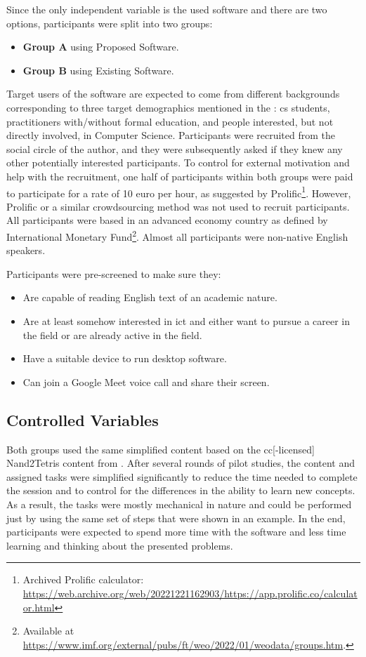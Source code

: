 Since the only independent variable is the used software and there are two options, participants were split into two groups:

\begin{itemize}
    \item \textbf{Group A} using Proposed Software.
    \item \textbf{Group B} using Existing Software.
\end{itemize}

Target users of the software are expected to come from different backgrounds corresponding to three target demographics mentioned in the : \gls{cs} students, practitioners with/without formal education, and people interested, but not directly involved, in Computer Science.
Participants were recruited from the social circle of the author, and they were subsequently asked if they knew any other potentially interested participants.
To control for external motivation and help with the recruitment, one half of participants within both groups were paid to participate for a rate of 10 euro per hour, as suggested by Prolific\footnote{Archived Prolific calculator: \url{https://web.archive.org/web/20221221162903/https://app.prolific.co/calculator.html}}.
However, Prolific or a similar crowdsourcing method was not used to recruit participants.
All participants were based in an advanced economy country as defined by International Monetary Fund\footnote{Available at \url{https://www.imf.org/external/pubs/ft/weo/2022/01/weodata/groups.htm}.}.
Almost all participants were non-native English speakers.

Participants were pre-screened to make sure they:
\begin{itemize}
    \item Are capable of reading English text of an academic nature.
    \item Are at least somehow interested in \gls{ict} and either want to pursue a career in the field or are already active in the field.
    \item Have a suitable device to run desktop software.
    \item Can join a Google Meet voice call and share their screen.
\end{itemize}

\subsection{Controlled Variables}

Both groups used the same simplified content based on the \gls{cc}[-licensed] Nand2Tetris content from \textcite{nand2tetris}.
After several rounds of pilot studies, the content and assigned tasks were simplified significantly to reduce the time needed to complete the session and to control for the differences in the ability to learn new concepts.
As a result, the tasks were mostly mechanical in nature and could be performed just by using the same set of steps that were shown in an example.
In the end, participants were expected to spend more time with the software and less time learning and thinking about the presented problems.


